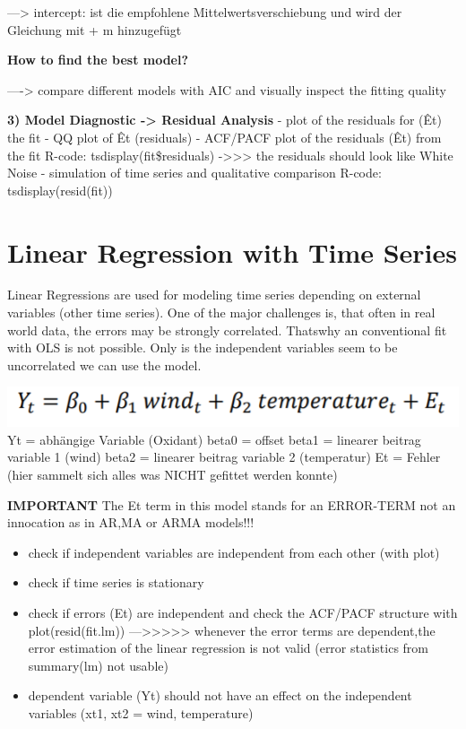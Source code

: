 \documentclass[
]{article}
\providecommand{\tightlist}{%
  \setlength{\itemsep}{0pt}\setlength{\parskip}{0pt}}
\begin{document}
---\textgreater{} intercept: ist die empfohlene Mittelwertsverschiebung
und wird der Gleichung mit + m hinzugefügt

\textbf{How to find the best model?}

----\textgreater{} compare different models with AIC and visually
inspect the fitting quality

\textbf{3) Model Diagnostic -\textgreater{} Residual Analysis} - plot of
the residuals for (Êt) the fit - QQ plot of Êt (residuals) - ACF/PACF
plot of the residuals (Êt) from the fit R-code:
tsdisplay(fit\$residuals) -\textgreater\textgreater\textgreater{} the
residuals should look like White Noise - simulation of time series and
qualitative comparison R-code: tsdisplay(resid(fit))

\hypertarget{linear-regression-with-time-series}{%
\section{Linear Regression with Time
Series}\label{linear-regression-with-time-series}}

Linear Regressions are used for modeling time series depending on
external variables (other time series). One of the major challenges is,
that often in real world data, the errors may be strongly correlated.
Thatswhy an conventional fit with OLS is not possible. Only is the
independent variables seem to be uncorrelated we can use the model.

\includegraphics[width=0.25\linewidth]{gls} Yt = abhängige Variable
(Oxidant) beta0 = offset beta1 = linearer beitrag variable 1 (wind)
beta2 = linearer beitrag variable 2 (temperatur) Et = Fehler (hier
sammelt sich alles was NICHT gefittet werden konnte)

\textbf{IMPORTANT} The Et term in this model stands for an ERROR-TERM
not an innocation as in AR,MA or ARMA models!!!

\begin{itemize}
\tightlist
\item
  check if independent variables are independent from each other (with
  plot)
\item
  check if time series is stationary
\item
  check if errors (Et) are independent and check the ACF/PACF structure
  with plot(resid(fit.lm))
  ---\textgreater\textgreater\textgreater\textgreater\textgreater{}
  whenever the error terms are dependent,the error estimation of the
  linear regression is not valid (error statistics from summary(lm) not
  usable)
\item
  dependent variable (Yt) should not have an effect on the independent
  variables (xt1, xt2 = wind, temperature)
\end{itemize}
\end{document}
